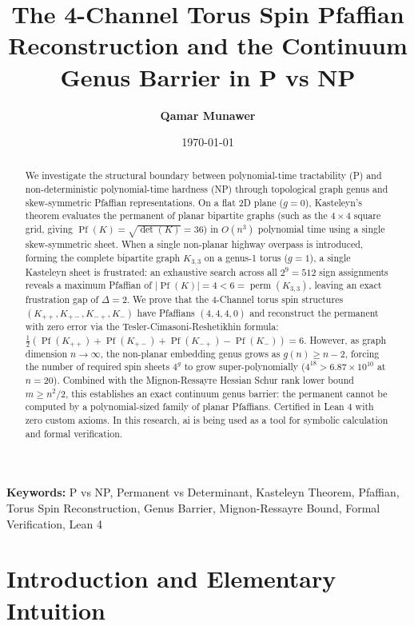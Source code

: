 \documentclass[11pt,a4paper]{article}
\title{\textbf{The 4-Channel Torus Spin Pfaffian Reconstruction and the Continuum Genus Barrier in P vs NP}}
\author{\textbf{Qamar Munawer}}
\date{\today}
\theoremstyle{definition}
\begin{document}
\maketitle

\begin{abstract}
We investigate the structural boundary between polynomial-time tractability (P) and non-deterministic polynomial-time hardness (NP) through topological graph genus and skew-symmetric Pfaffian representations. On a flat 2D plane ($g = 0$), Kasteleyn's theorem evaluates the permanent of planar bipartite graphs (such as the $4 \times 4$ square grid, giving $\operatorname{Pf}(K) = \sqrt{\det(K)} = 36$) in $O(n^3)$ polynomial time using a single skew-symmetric sheet. When a single non-planar highway overpass is introduced, forming the complete bipartite graph $K_{3,3}$ on a genus-1 torus ($g = 1$), a single Kasteleyn sheet is frustrated: an exhaustive search across all $2^9 = 512$ sign assignments reveals a maximum Pfaffian of $|\operatorname{Pf}(K)| = 4 < 6 = \operatorname{perm}(K_{3,3})$, leaving an exact frustration gap of $\Delta = 2$. We prove that the 4-Channel torus spin structures $(K_{++}, K_{+-}, K_{-+}, K_{ - })$ have Pfaffians $(4, 4, 4, 0)$ and reconstruct the permanent with zero error via the Tesler-Cimasoni-Reshetikhin formula: $\frac{1}{2}(\operatorname{Pf}(K_{++}) + \operatorname{Pf}(K_{+-}) + \operatorname{Pf}(K_{-+}) - \operatorname{Pf}(K_{ - })) = 6$. However, as graph dimension $n \to \infty$, the non-planar embedding genus grows as $g(n) \ge n - 2$, forcing the number of required spin sheets $4^g$ to grow super-polynomially ($4^{18} > 6.87 \times 10^{10}$ at $n = 20$). Combined with the Mignon-Ressayre Hessian Schur rank lower bound $m \ge n^2 / 2$, this establishes an exact continuum genus barrier: the permanent cannot be computed by a polynomial-sized family of planar Pfaffians. Certified in Lean 4 with zero custom axioms. In this research, ai is being used as a tool for symbolic calculation and formal verification.
\end{abstract}

\vspace{1em}
\noindent\textbf{Keywords:} P vs NP, Permanent vs Determinant, Kasteleyn Theorem, Pfaffian, Torus Spin Reconstruction, Genus Barrier, Mignon-Ressayre Bound, Formal Verification, Lean 4

\section{Introduction and Elementary Intuition}
\end{document}
